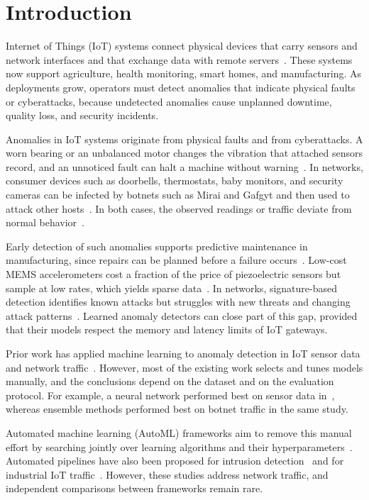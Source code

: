 \section{Introduction}\label{sec:intro}
Internet of Things (IoT) systems connect physical devices that carry sensors and network interfaces and that exchange data with remote servers~\cite{atzori2010,gubbi2013}. These systems now support agriculture, health monitoring, smart homes, and manufacturing. As deployments grow, operators must detect anomalies that indicate physical faults or cyberattacks, because undetected anomalies cause unplanned downtime, quality loss, and security incidents.

Anomalies in IoT systems originate from physical faults and from cyberattacks. A worn bearing or an unbalanced motor changes the vibration that attached sensors record, and an unnoticed fault can halt a machine without warning~\cite{wang2018,gummadi2024xaiiot}. In networks, consumer devices such as doorbells, thermostats, baby monitors, and security cameras can be infected by botnets such as Mirai and Gafgyt and then used to attack other hosts~\cite{meidan2018nbaiot,antonakakis2017}. In both cases, the observed readings or traffic deviate from normal behavior~\cite{chandola2009}.

Early detection of such anomalies supports predictive maintenance in manufacturing, since repairs can be planned before a failure occurs~\cite{wang2018}. Low-cost MEMS accelerometers cost a fraction of the price of piezoelectric sensors but sample at low rates, which yields sparse data~\cite{gummadi2024xaiiot}. In networks, signature-based detection identifies known attacks but struggles with new threats and changing attack patterns~\cite{asad2022}. Learned anomaly detectors can close part of this gap, provided that their models respect the memory and latency limits of IoT gateways.

Prior work has applied machine learning to anomaly detection in IoT sensor data and network traffic~\cite{vinayakumar2019,tama2019,bibers2024,gummadi2024xaiiot}. However, most of the existing work selects and tunes models manually, and the conclusions depend on the dataset and on the evaluation protocol. For example, a neural network performed best on sensor data in~\cite{gummadi2024xaiiot}, whereas ensemble methods performed best on botnet traffic in the same study.

Automated machine learning (AutoML) frameworks aim to remove this manual effort by searching jointly over learning algorithms and their hyperparameters~\cite{thornton2013,feurer2015,ledell2020}. Automated pipelines have also been proposed for intrusion detection~\cite{yang2024automl,injadat2021,guntur2025autoai} and for industrial IoT traffic~\cite{sezgin2023}. However, these studies address network traffic, and independent comparisons between frameworks remain rare.

